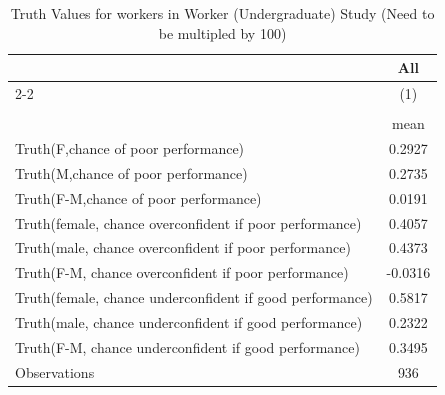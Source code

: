 \begin{table}[htbp]\centering
\def\sym#1{\ifmmode^{#1}\else\(^{#1}\)\fi}
\caption{Truth Values for workers in Worker (Undergraduate) Study (Need to be multipled by 100) }
\begin{tabular}{l*{1}{c}}
\hline\hline
                    &\multicolumn{1}{c}{All}\\\cmidrule(lr){2-2}
                    &\multicolumn{1}{c}{(1)}\\
                    &\multicolumn{1}{c}{}\\
                    &        mean\\
\hline
Truth(F,chance of poor performance)&      0.2927\\
Truth(M,chance of poor performance)&      0.2735\\
Truth(F-M,chance of poor performance)&      0.0191\\
Truth(female, chance overconfident if poor performance)&      0.4057\\
Truth(male, chance overconfident if poor performance)&      0.4373\\
Truth(F-M, chance overconfident if poor performance)&     -0.0316\\
Truth(female, chance underconfident if good performance)&      0.5817\\
Truth(male, chance underconfident if good performance)&      0.2322\\
Truth(F-M, chance underconfident if good performance)&      0.3495\\
\hline
Observations        &         936\\
\hline\hline
\end{tabular}
\end{table}
